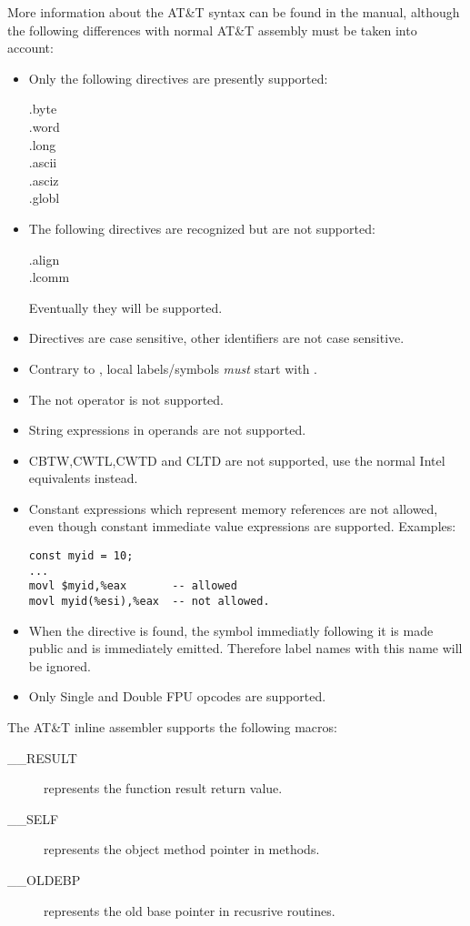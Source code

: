More information about the AT\&T syntax can be found in the  manual,
although the following differences with normal AT\&T assembly must be taken
into account:
\begin{itemize}
\item  Only the following directives are presently supported:
 \begin{description}
\item[.byte]
\item[.word]
\item[.long]
\item[.ascii]
\item[.asciz]
\item[.globl]
\end{description}
\item  The following directives are recognized but are not
   supported:
\begin{description}
\item[.align]
\item[.lcomm]
\end{description}
Eventually they will be supported.
\item Directives are case sensitive, other identifiers are not case sensitive.
\item  Contrary to , local labels/symbols {\em must} start with
.
\item  The not operator  is not supported.
\item  String expressions in operands are not supported.
\item  CBTW,CWTL,CWTD and CLTD are not supported, use the normal Intel
equivalents instead.
\item  Constant expressions which represent memory references are not
allowed, even though constant immediate value expressions are supported.
Examples:
\begin{verbatim}
const myid = 10;
...
movl $myid,%eax       -- allowed
movl myid(%esi),%eax  -- not allowed.
\end{verbatim}
\item When the  directive is found, the symbol immediatly following
it is made public and is immediately emitted.
Therefore label names with this name will be ignored.
\item  Only Single and Double FPU opcodes are supported.
\end{itemize}

The AT\&T inline assembler supports the following macros:
\begin{description}
\item [\_\_RESULT] represents the function result return value.
\item [\_\_SELF]   represents the object method pointer in methods.
\item [\_\_OLDEBP] represents the old base pointer in recusrive routines.
\end{description}

